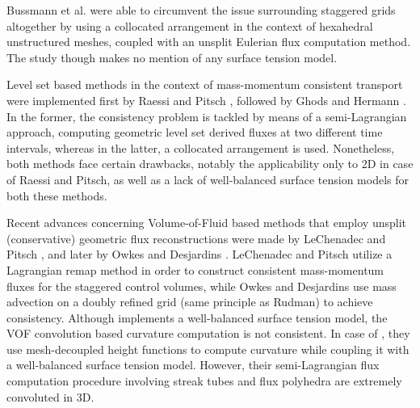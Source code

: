 Bussmann et al.  were able to 
circumvent the issue surrounding staggered grids altogether 
by using a collocated arrangement in the context of hexahedral 
unstructured meshes, coupled with an unsplit Eulerian flux computation method.    
The study though makes no mention of any surface tension model. 


Level set based methods in the context of mass-momentum consistent 
transport were implemented first by Raessi and Pitsch , 
followed by Ghods and Hermann \cite{ghods2013consistent}. 
In the former, the consistency problem is tackled by means of a 
semi-Lagrangian approach, computing geometric level set derived 
fluxes at two different time intervals, whereas in the latter, 
a collocated arrangement is used. 
Nonetheless, both methods face certain drawbacks, notably the 
applicability only to 2D in case of Raessi and Pitsch, 
as well as a lack of well-balanced surface tension models for both these methods.   


Recent advances concerning Volume-of-Fluid based methods that 
employ unsplit (conservative) geometric flux reconstructions 
were made by LeChenadec and Pitsch 
, and later by Owkes and Desjardins \cite{owkes2017mass}. 
LeChenadec and Pitsch utilize a Lagrangian remap method in order 
to construct consistent mass-momentum fluxes for the staggered control volumes, 
while Owkes and Desjardins use mass advection on a doubly refined grid 
(same principle as Rudman) to achieve consistency.     
Although \cite{le2013monotonicity} implements a well-balanced surface tension model, 
the VOF convolution based curvature computation is not consistent. 
In case of , they use mesh-decoupled height functions 
to compute curvature while coupling it with a well-balanced surface tension model. 
However, their semi-Lagrangian flux computation procedure 
involving streak tubes and flux polyhedra are extremely convoluted in 3D.     


